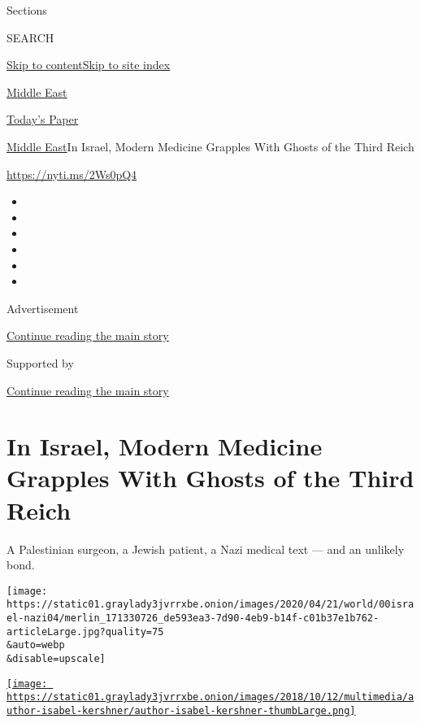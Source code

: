 Sections

SEARCH

\protect\hyperlink{site-content}{Skip to
content}\protect\hyperlink{site-index}{Skip to site index}

\href{https://www.nytimes3xbfgragh.onion/section/world/middleeast}{Middle
East}

\href{https://myaccount.nytimes3xbfgragh.onion/auth/login?response_type=cookie\&client_id=vi}{}

\href{https://www.nytimes3xbfgragh.onion/section/todayspaper}{Today's
Paper}

\href{/section/world/middleeast}{Middle East}\textbar{}In Israel, Modern
Medicine Grapples With Ghosts of the Third Reich

\url{https://nyti.ms/2Ws0pQ4}

\begin{itemize}
\item
\item
\item
\item
\item
\item
\end{itemize}

Advertisement

\protect\hyperlink{after-top}{Continue reading the main story}

Supported by

\protect\hyperlink{after-sponsor}{Continue reading the main story}

\hypertarget{in-israel-modern-medicine-grapples-with-ghosts-of-the-third-reich}{%
\section{In Israel, Modern Medicine Grapples With Ghosts of the Third
Reich}\label{in-israel-modern-medicine-grapples-with-ghosts-of-the-third-reich}}

A Palestinian surgeon, a Jewish patient, a Nazi medical text --- and an
unlikely bond.

\texttt{[image: https://static01.graylady3jvrrxbe.onion/images/2020/04/21/world/00israel-nazi04/merlin\_171330726\_de593ea3-7d90-4eb9-b14f-c01b37e1b762-articleLarge.jpg?quality=75\\\&auto=webp\\\&disable=upscale]}

\href{https://www.nytimes3xbfgragh.onion/by/isabel-kershner}{\texttt{[image: https://static01.graylady3jvrrxbe.onion/images/2018/10/12/multimedia/author-isabel-kershner/author-isabel-kershner-thumbLarge.png]}}

